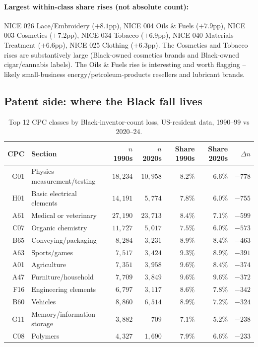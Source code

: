 \documentclass[11pt]{article}
\begin{document}
\paragraph{Largest within-class share rises (not absolute count):}
NICE 026 Lace/Embroidery ($+8.1$pp), NICE 004 Oils \& Fuels
($+7.9$pp), NICE 003 Cosmetics ($+7.2$pp), NICE 034 Tobacco
($+6.9$pp), NICE 040 Materials Treatment ($+6.6$pp), NICE 025
Clothing ($+6.3$pp). The Cosmetics and Tobacco rises are
substantively large (Black-owned cosmetics brands and Black-owned
cigar/cannabis labels). The Oils \& Fuels rise is interesting and
worth flagging -- likely small-business energy/petroleum-products
resellers and lubricant brands.

\subsection*{Patent side: where the Black fall lives}

\begin{table}[h]
\centering
\small
\begin{tabular}{rlrrrrr}
\toprule
CPC & Section & $n$ 1990s & $n$ 2020s & Share 1990s & Share 2020s & $\Delta n$ \\
\midrule
G01 & Physics measurement/testing  & $18{,}234$ & $10{,}958$ & $8.2\%$ & $6.6\%$ & $-778$ \\
H01 & Basic electrical elements    & $14{,}191$ &  $5{,}774$ & $7.8\%$ & $6.0\%$ & $-755$ \\
A61 & Medical or veterinary        & $27{,}190$ & $23{,}713$ & $8.4\%$ & $7.1\%$ & $-599$ \\
C07 & Organic chemistry            & $11{,}727$ &  $5{,}017$ & $7.5\%$ & $6.0\%$ & $-573$ \\
B65 & Conveying/packaging          &  $8{,}284$ &  $3{,}231$ & $8.9\%$ & $8.4\%$ & $-463$ \\
A63 & Sports/games                 &  $7{,}517$ &  $3{,}424$ & $9.3\%$ & $8.9\%$ & $-391$ \\
A01 & Agriculture                  &  $7{,}351$ &  $3{,}958$ & $9.6\%$ & $8.4\%$ & $-374$ \\
A47 & Furniture/household          &  $7{,}709$ &  $3{,}849$ & $9.6\%$ & $9.6\%$ & $-372$ \\
F16 & Engineering elements         &  $6{,}797$ &  $3{,}117$ & $8.6\%$ & $7.8\%$ & $-342$ \\
B60 & Vehicles                     &  $8{,}860$ &  $6{,}514$ & $8.9\%$ & $7.2\%$ & $-324$ \\
G11 & Memory/information storage   &  $3{,}882$ &     $709$  & $7.1\%$ & $5.2\%$ & $-238$ \\
C08 & Polymers                     &  $4{,}327$ &  $1{,}690$ & $7.9\%$ & $6.6\%$ & $-233$ \\
\bottomrule
\end{tabular}
\caption{Top 12 CPC classes by Black-inventor-count loss, US-resident
data, 1990--99 vs 2020--24.}
\end{table}
\end{document}

